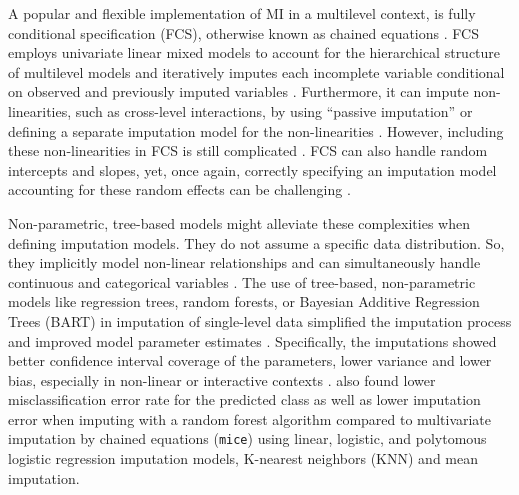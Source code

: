\documentclass[3p,12pt,a4paper]{elsarticle}
\begin{document}
A popular and flexible implementation of MI in a multilevel context, is fully conditional specification (FCS), otherwise known as chained equations \citep{audigier2018, burgette2010, vanbuuren2007, grund2018a}. FCS employs univariate linear mixed models to account for the hierarchical structure of multilevel models \citep{mistlerComparisonJointModel2017, enders2018, resche-rigon2018} and iteratively imputes each incomplete variable conditional on observed and previously imputed variables \citep{mistlerComparisonJointModel2017, buurenFlexibleImputationMissing2018, enders2016, enders2018, enders2018a, hughes2014, grund2018a}. Furthermore, it can impute non-linearities, such as cross-level interactions, by using ``passive imputation'' or defining a separate imputation model for the non-linearities \citep{buurenFlexibleImputationMissing2018, grund2018}. However, including these non-linearities in FCS is still complicated \citep{grund2021, grund2018,buurenFlexibleImputationMissing2018}. FCS can also handle random intercepts and slopes, yet, once again, correctly specifying an imputation model accounting for these random effects can be challenging \citep{grund2021, grund2018,buurenFlexibleImputationMissing2018}.

Non-parametric, tree-based models might alleviate these complexities when defining imputation models. They do not assume a specific data distribution. So, they implicitly model non-linear relationships and can simultaneously handle continuous and categorical variables \citep{hill2020, burgette2010, lin2019, chipman2010, james2021, salditt2023, breiman1984}. The use of tree-based, non-parametric models like regression trees, random forests, or Bayesian Additive Regression Trees (BART) in imputation of single-level data simplified the imputation process and improved model parameter estimates \citep{burgette2010,xu2016,silva2022,waljee2013}. Specifically, the imputations showed better confidence interval coverage of the parameters, lower variance and lower bias, especially in non-linear or interactive contexts \citep{burgette2010, xu2016, silva2022}. \citet{waljee2013} also found lower misclassification error rate for the predicted class as well as lower imputation error when imputing with a random forest algorithm compared to multivariate imputation by chained equations (\texttt{mice}) using linear, logistic, and polytomous logistic regression imputation models, K-nearest neighbors (KNN) and mean imputation.
\end{document}
